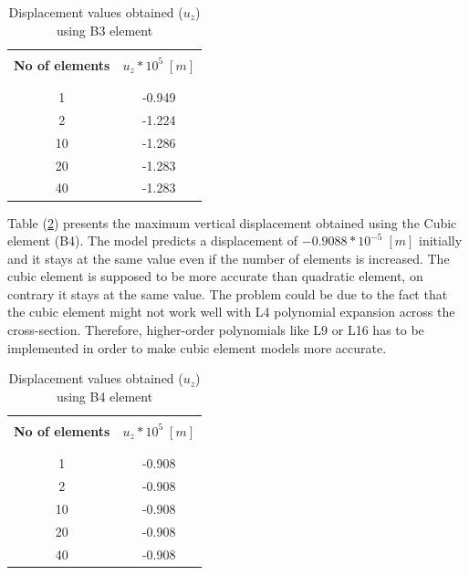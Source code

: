 \documentclass[a4paper,12pt]{article}
\begin{document}
\begin{table}[h!]
  \begin{center}
     \begin{tabular}{c c}
      \hline\\
      \textbf{No of elements} & \textbf{$u_{z}*10^{5}\;[m]$} \\
      \\
      \hline
      \\[-2pt]
       1 & -0.949 \\[5pt]
       2 & -1.224 \\[5pt]
      10 & -1.286 \\[5pt]
      20 & -1.283 \\[5pt]
      40 & -1.283 \\[5pt]

      \hline
     \end{tabular}
    \caption{Displacement values obtained ($u_{z}$) using B3 element}
    \label{tab:table 5}
  \end{center}
\end{table}

Table (\ref{tab:table 6}) presents the maximum vertical displacement obtained using the Cubic element (B4). The model predicts a displacement of $-0.9088*10^{-5}\;[m]$ initially and it stays at the same value even if the number of elements is increased. The cubic element is supposed to be more accurate than quadratic element, on contrary it stays at the same value. The problem could be due to the fact that the cubic element might not work well with L4 polynomial expansion across the cross-section. Therefore, higher-order polynomials like L9 or L16 has to be implemented in order to make cubic element models more accurate. 
\begin{table}[h!]
  \begin{center}
     \begin{tabular}{c c}
      \hline\\
      \textbf{No of elements} & \textbf{$u_{z}*10^{5}\;[m]$} \\
      \\
      \hline
      \\[-2pt]
       1 & -0.908 \\[5pt]
       2 & -0.908 \\[5pt]
      10 & -0.908 \\[5pt]
      20 & -0.908 \\[5pt]
      40 & -0.908 \\[5pt]

      \hline
     \end{tabular}
    \caption{Displacement values obtained ($u_{z}$) using B4 element}
    \label{tab:table 6}
  \end{center}
\end{table}
\end{document}
